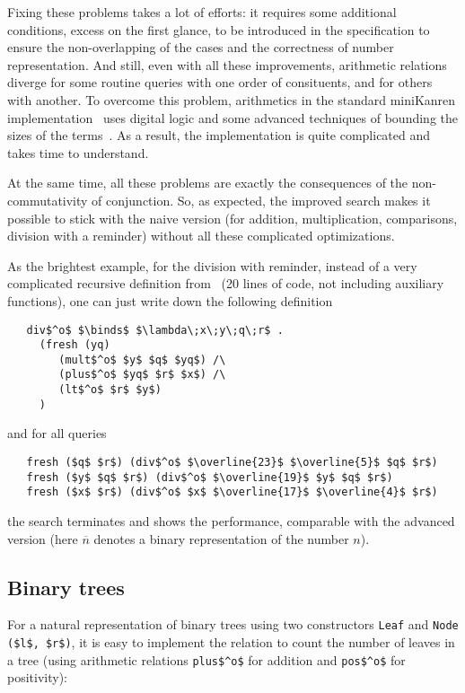 Fixing these problems takes a lot of efforts: it requires some additional conditions, 
excess on the first glance, to be introduced in the specification to ensure the non-overlapping 
of the cases and the correctness of number representation. And still, even with all these 
improvements, arithmetic relations diverge for some routine queries with one order of 
consituents, and for others with another. To overcome this problem, 
arithmetics in the standard miniKanren implementation~\cite{TRS} uses digital logic and 
some advanced techniques of bounding the sizes of the terms~\cite{KiselyovArithmetic}. 
As a result, the implementation is quite complicated and takes time to understand.

At the same time, all these problems are exactly the consequences of the non-commutativity 
of conjunction. So, as expected, the improved search makes it possible to stick with
the naive version (for addition, multiplication, comparisons, division with a reminder)
without all these complicated optimizations. 

As the brightest example, for the division with reminder, instead of a very complicated recursive definition 
from~\cite{TRS} (20 lines of code, not including auxiliary functions), one can just write down the 
following definition

\begin{lstlisting}
   div$^o$ $\binds$ $\lambda\;x\;y\;q\;r$ . 
     (fresh (yq)        
        (mult$^o$ $y$ $q$ $yq$) /\
        (plus$^o$ $yq$ $r$ $x$) /\
        (lt$^o$ $r$ $y$)
     )
\end{lstlisting}

\noindent and for all queries

\begin{lstlisting}
   fresh ($q$ $r$) (div$^o$ $\overline{23}$ $\overline{5}$ $q$ $r$)
   fresh ($y$ $q$ $r$) (div$^o$ $\overline{19}$ $y$ $q$ $r$)
   fresh ($x$ $r$) (div$^o$ $x$ $\overline{17}$ $\overline{4}$ $r$)
\end{lstlisting}

\noindent the search terminates and shows the performance, comparable with the advanced version 
(here $\overline{n}$ denotes a binary representation of the number $n$).

\subsection{Binary trees}

For a natural representation of binary trees using two constructors \lstinline|Leaf| and 
\lstinline|Node ($l$, $r$)|, it is easy to implement the relation to count the number of 
leaves in a tree (using arithmetic relations \lstinline|plus$^o$| for addition and \lstinline|pos$^o$|
for positivity):

